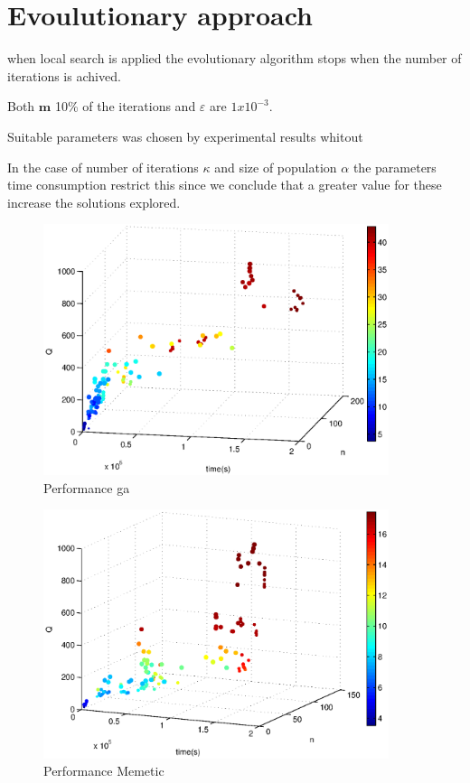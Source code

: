 \section{Evoulutionary approach}

when local search is applied the evolutionary algorithm stops when the number of iterations is achived.

Both $\mathbf{m}$ 10\% of the iterations  and $\varepsilon$ are $1x10^{-3}$.

Suitable parameters was chosen by experimental results whitout 

In the case of number of iterations $\kappa$ and size of population $\alpha$ the parameters time consumption restrict this since we conclude that a greater value for these increase the solutions explored.

\begin{figure}[!htbp]
  \begin{center}
   \includegraphics[width=0.9\textwidth]{Images/Chapter5/compare_expected_distance_ga.eps}
  \end{center}
    \caption{Performance ga}\label{fig:compare_expected_distance_ga}
\end{figure}

\begin{figure}[!htbp]
  \begin{center}
   \includegraphics[width=0.9\textwidth]{Images/Chapter5/compare_expected_distance_memetic.eps}
  \end{center}
    \caption{Performance Memetic}\label{fig:compare_expected_distance_memetic}
\end{figure}

